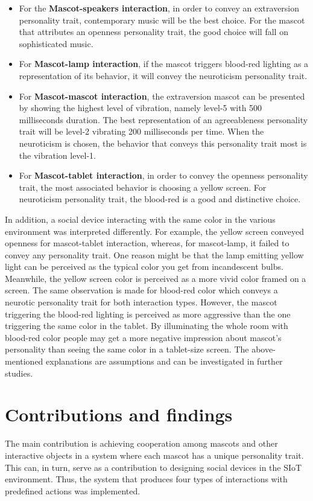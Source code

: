 \begin{itemize}
    \item For the \textbf{Mascot-speakers interaction}, in order to convey an extraversion personality trait,
    contemporary music will be the best choice.
    For the mascot that attributes an openness personality trait,
    the good choice will fall on sophisticated music.
    \item For \textbf{Mascot-lamp interaction}, if the mascot triggers blood-red lighting as a
    representation of its behavior, it will convey the neuroticism personality trait.
    \item For \textbf{Mascot-mascot interaction}, the extraversion mascot can be presented by
    showing the highest level of vibration, namely level-5 with 500 milliseconds duration.
    The best representation of an agreeableness personality trait will be level-2 vibrating 200 milliseconds per time.
    When the neuroticism is chosen, the behavior that conveys this personality trait most is the vibration level-1.
    \item For \textbf{Mascot-tablet interaction}, in order to convey the openness personality trait,
    the most associated behavior is choosing a yellow screen.
    For neuroticism personality trait, the blood-red is a good and distinctive choice.
\end{itemize}

In addition, a social device interacting with the same color in the various environment was interpreted differently.
For example, the yellow screen conveyed openness for mascot-tablet interaction, whereas, for mascot-lamp,
it failed to convey any personality trait.
One reason might be that the lamp emitting yellow light can be perceived
as the typical color you get from incandescent bulbs.
Meanwhile, the yellow screen color is perceived as a more vivid color framed on a screen.
The same observation is made for blood-red color which conveys a neurotic personality trait for both interaction types.
However, the mascot triggering the blood-red lighting is perceived as
more aggressive than the one triggering the same color in the tablet.
By illuminating the whole room with blood-red color people may
get a more negative impression about mascot’s personality than seeing the same color in a tablet-size screen.
The above-mentioned explanations are assumptions and can be investigated in further studies.

\section{Contributions and findings}
\label{sec:contributions-and-findings}
The main contribution is achieving cooperation among mascots and other interactive
objects in a system where each mascot has a unique personality trait.
This can, in turn, serve as a contribution to designing social devices in the SIoT environment.
Thus, the system that produces four types of interactions with predefined actions was implemented.

